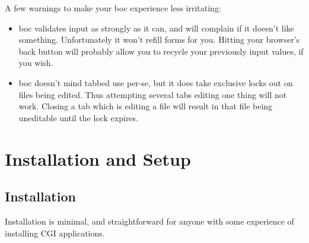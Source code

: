 \documentclass{report}
\begin{document}
A few warnings to make your boc experience less irritating:
\begin{itemize}
\item boc validates input as strongly as it can, and will complain if it doesn't like something.  Unfortunately it won't refill forms for you.  Hitting your browser's back button will probably allow you to recycle your previously input values, if you wish.
\item boc doesn't mind tabbed use per-se, but it does take exclusive locks out on files being edited.  Thus attempting several tabs editing one thing will not work.  Closing a tab which is editing a file will result in that file being uneditable until the lock expires.
\end{itemize}

\chapter{Installation and Setup}

\section{Installation}

Installation is minimal, and straightforward for anyone with some experience of installing CGI applications.
\end{document}
